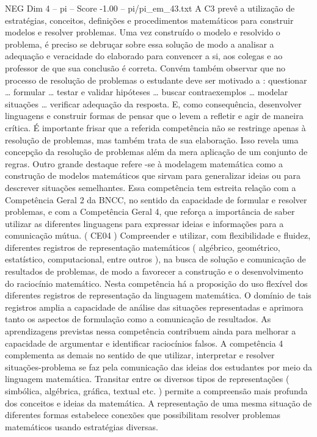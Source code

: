 \begin{textsample}{NEG Dim 4 – pi – Score -1.00 – pi/pi\_em\_43.txt}
A C3 prevê a utilização de estratégias, conceitos, definições e procedimentos matemáticos para construir modelos e resolver problemas.
Uma vez construído o modelo e resolvido o problema, é preciso se debruçar sobre essa solução de modo a analisar a adequação e veracidade do elaborado para convencer a si, aos colegas e ao professor de que sua conclusão é correta.
Convém também observar que no processo de resolução de problemas o estudante deve ser motivado a : questionar … formular … testar e validar hipóteses … buscar contraexemplos … modelar situações … verificar adequação da resposta.
E, como consequência, desenvolver linguagens e construir formas de pensar que o levem a refletir e agir de maneira crítica.
É importante frisar que a referida competência não se restringe apenas à resolução de problemas, mas também trata de sua elaboração.
Isso revela uma concepção da resolução de problemas além da mera aplicação de um conjunto de regras.
Outro grande destaque refere -se à modelagem matemática como a construção de modelos matemáticos que sirvam para generalizar ideias ou para descrever situações semelhantes.
Essa competência tem estreita relação com a Competência Geral 2 da BNCC, no sentido da capacidade de formular e resolver problemas, e com a Competência Geral 4, que reforça a importância de saber utilizar as diferentes linguagens para expressar ideias e informações para a comunicação mútua. ( CE04 ) Compreender e utilizar, com flexibilidade e fluidez, diferentes registros de representação matemáticos ( algébrico, geométrico, estatístico, computacional, entre outros ), na busca de solução e comunicação de resultados de problemas, de modo a favorecer a construção e o desenvolvimento do raciocínio matemático.
Nesta competência há a proposição do uso flexível dos diferentes registros de representação da linguagem matemática.
O domínio de tais registros amplia a capacidade de análise das situações representadas e aprimora tanto os aspectos de formulação como a comunicação de resultados.
As aprendizagens previstas nessa competência contribuem ainda para melhorar a capacidade de argumentar e identificar raciocínios falsos.
A competência 4 complementa as demais no sentido de que utilizar, interpretar e resolver situações-problema se faz pela comunicação das ideias dos estudantes por meio da linguagem matemática.
Transitar entre os diversos tipos de representações ( simbólica, algébrica, gráfica, textual etc. ) permite a compreensão mais profunda dos conceitos e ideias da matemática.
A representação de uma mesma situação de diferentes formas estabelece conexões que possibilitam resolver problemas matemáticos usando estratégias diversas.

\end{textsample}

